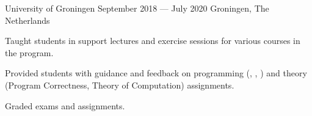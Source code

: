 \begin{cventries}
{\begin{cvitems}
		\end{cvitems}
	}
	{University of Groningen}
	{September 2018 --- July 2020} %
	{Groningen, The Netherlands}
	{%
		\begin{cvitems}
		\item Taught students in support lectures and exercise sessions for various courses in the program.
		\item Provided students with guidance and feedback on programming (, , ) and theory\\ (Program Correctness, Theory of Computation) assignments.
		\item Graded exams and assignments.
		\end{cvitems}
	}

\end{cventries}
